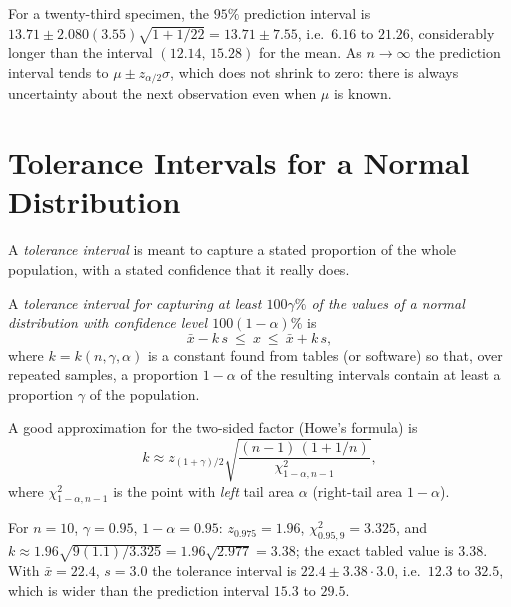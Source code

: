 \begin{example}
For a twenty-third specimen, the $95\%$ prediction interval is $13.71\pm2.080(3.55)\sqrt{1+1/22}=13.71\pm7.55$, i.e.\ $6.16$ to $21.26$, considerably longer than the interval $(12.14,\,15.28)$ for the mean. As $n\to\infty$ the prediction interval tends to $\mu\pm z_{\alpha/2}\sigma$, which does not shrink to zero: there is always uncertainty about the next observation even when $\mu$ is known.
\end{example}

\section{Tolerance Intervals for a Normal Distribution}

A \emph{tolerance interval} is meant to capture a stated proportion of the whole population, with a stated confidence that it really does.

\begin{definition}
A \emph{tolerance interval for capturing at least $100\gamma\%$ of the values of a normal distribution with confidence level $100(1-\alpha)\%$} is
\[ \bar{x}-k\,s\ \le\ x\ \le\ \bar{x}+k\,s, \]
where $k=k(n,\gamma,\alpha)$ is a constant found from tables (or software) so that, over repeated samples, a proportion $1-\alpha$ of the resulting intervals contain at least a proportion $\gamma$ of the population.
\end{definition}

A good approximation for the two-sided factor (Howe's formula) is
\[ k\approx z_{(1+\gamma)/2}\sqrt{\frac{(n-1)\,(1+1/n)}{\chi^2_{1-\alpha,n-1}}}, \]
where $\chi^2_{1-\alpha,n-1}$ is the point with \emph{left} tail area $\alpha$ (right-tail area $1-\alpha$).

\begin{example}
For $n=10$, $\gamma=0.95$, $1-\alpha=0.95$: $z_{0.975}=1.96$, $\chi^2_{0.95,9}=3.325$, and $k\approx1.96\sqrt{9(1.1)/3.325}=1.96\sqrt{2.977}=3.38$; the exact tabled value is $3.38$. With $\bar{x}=22.4$, $s=3.0$ the tolerance interval is $22.4\pm3.38\cdot3.0$, i.e.\ $12.3$ to $32.5$, which is wider than the prediction interval $15.3$ to $29.5$.
\end{example}

